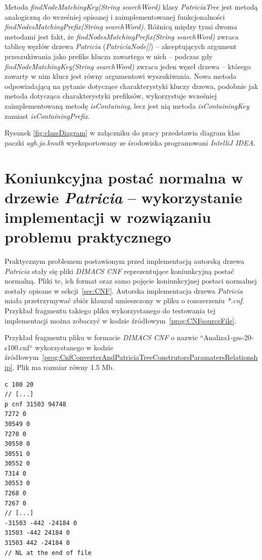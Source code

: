 		Metoda \emph{findNodeMatchingKey(String searchWord)} klasy \emph{PatriciaTree} jest metodą analogiczną do wcześniej opisanej i zaimplementowanej funkcjonalności \emph{findNodesMatchingPrefix(String searchWord)}. Różnicą między tymi dwoma metodami jest fakt, że \emph{findNodesMatchingPrefix(String searchWord)} zwraca tablicę węzłów drzewa \emph{Patricia} (\emph{PatriciaNode[]}) -- akceptujących argument przeszukiwania jako prefiks klucza zawartego w nich -- podczas gdy \emph{findNodeMatchingKey(String searchWord)} zwraca jeden węzeł drzewa -- którego zawarty w nim klucz jest równy argumentowi wyszukiwania. Nowa metoda odpowiadającą na pytanie dotyczące charakterystyki kluczy drzewa, podobnie jak metoda dotycząca charakterystyki prefiksów, wykorzystuje wcześniej zaimplementowaną metodę \emph{isContaining}, lecz jest nią metoda \emph{isContainingKey} zamiast \emph{isContainingPrefix}.
		
		Rysunek \ref{fig:classDiagram} w załączniku do pracy przedstawia diagram klas paczki \emph{agh.jo.knuth} wyeksportowany ze środowiska programowani \emph{IntelliJ IDEA}.
				
		\section{Koniunkcyjna postać normalna w drzewie \emph{Patricia} -- wykorzystanie implementacji w rozwiązaniu problemu praktycznego}\label{sec:czescPraktycznaCNF}
		
		Praktycznym problemem postawionym przed implementacją autorską drzewa \emph{Patricia} stały się pliki \emph{DIMACS CNF} reprezentujące koniunkcyjną postać normalną. Pliki te, ich format oraz samo pojęcie koniunkcyjnej postaci normalnej zostały opisane w sekcji~\ref{sec:CNF}. Autorska implementacja drzewa \emph{Patricia} miała przetrzymywać zbiór klauzul umieszczony w pliku o rozszerzeniu \emph{*.cnf}. Przykład fragmentu takiego pliku wykorzystanego do testowania tej implementacji można zobaczyć w kodzie źródłowym~\ref{prog:CNFsourceFile}. \newpage
				
		\begin{program}
			\caption{Przykład fragmentu pliku w formacie \emph{DIMACS CNF} o nazwie ``Analiza1-gss-20-s100.cnf`` wykorzystanego w kodzie źródłowym~\ref{prog:CnfConverterAndPatriciaTreeConstrutorsParamatersRelationship}. Plik ma rozmiar równy 1.5 Mb.}\label{prog:CNFsourceFile}
    		\begin{lstlisting}[basicstyle=\scriptsize,]
c 100 20
// [...]
p cnf 31503 94748
7272 0
30549 0
7270 0
30550 0
30551 0
30552 0
7314 0
30553 0
7268 0
7267 0
// [...]
-31503 -442 -24184 0
31503 -442 24184 0
31503 442 -24184 0
// NL at the end of file
    		\end{lstlisting}
		\end{program}
		
